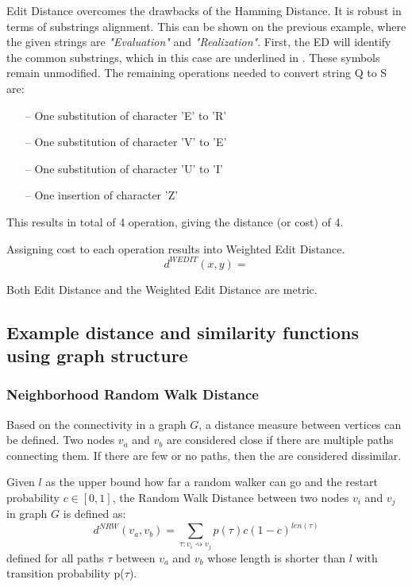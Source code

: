 Edit Distance overcomes the drawbacks of the Hamming Distance. 
It is robust in terms of substrings alignment. 
This can be shown on the previous example, where the given strings are \emph{"Evaluation"} and \emph{"Realization"}.
First, the ED will identify the common substrings, which in this case are underlined in . 
These symbols remain unmodified. 
The remaining operations needed to convert string Q to  S are:
\begin{itemize}
	\item[--] One substitution of character 'E' to 'R'
	\item[--] One substitution of character 'V' to 'E'
	\item[--] One substitution of character 'U' to 'I'
	\item[--] One insertion of character 'Z'
\end{itemize}

This results in total of 4 operation, giving the distance (or cost) of 4.

Assigning cost to each operation results into Weighted Edit Distance\cite{Chen:2004:MLE:1316689.1316758}.
\begin{equation}
	d^{WEDIT}(x,y) = 
\end{equation}

Both Edit Distance and the Weighted Edit Distance are metric.

\subsection{Example distance and similarity functions using graph structure}

\subsubsection{Neighborhood Random Walk Distance}

Based on the connectivity in a graph $G$, a distance measure between vertices can be defined. 
Two nodes $v_{a}$ and $v_{b}$ are considered close if there are multiple paths connecting them. 
If there are few or no paths, then the are considered dissimilar.

\begin{definition}
	Given $l$ as the upper bound how far a random walker can go and the restart probability $c \in [0, 1]$, 
the Random Walk Distance between two nodes  $v_{i}$ and $v_{j}$ in graph $G$ is defined as:
\begin{equation}
	d^{NRW}(v_{a}, v_{b}) = \sum_{\tau:v_{i}\rightsquigarrow v_{j}}p(\tau)c(1-c)^{len(\tau)}
\end{equation}
defined for all paths $\tau$ between $v_{a}$ and $v_{b}$ whose length is shorter than $l$ with transition probability p($\tau$). 
\end{definition}

